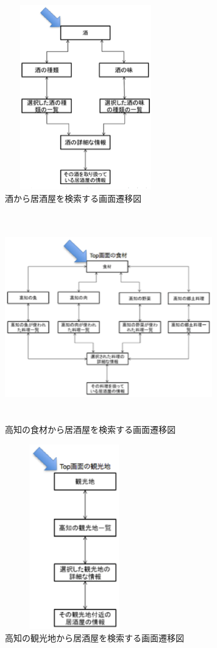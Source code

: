 \documentclass[a4j,titlepage]{jarticle}
\begin{document}
\begin {figure}[!htbp]
    \begin{center}
    \includegraphics [height=8cm, width=7cm]{sake.eps}
    \caption {酒から居酒屋を検索する画面遷移図}
    \label {fig:sake}
    \end{center}
\end {figure}




\begin {figure}[!htbp]
    \begin{center}
    \includegraphics [height=9cm, width=9cm]{shokuzai.eps}
    \caption {高知の食材から居酒屋を検索する画面遷移図}
    \label {fig:shokuzai}
    \end{center}
\end {figure}




\begin {figure}[!htbp]
    \begin{center}
    \includegraphics [height=8cm, width=6cm]{kankou.eps}
    \caption {高知の観光地から居酒屋を検索する画面遷移図}
    \label {fig:kankou}
    \end{center}
\end {figure}
\end{document}
